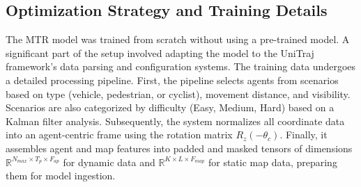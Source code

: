 \subsection{Optimization Strategy and Training Details}
\label{sec:model_optimization_details}
The MTR model was trained from scratch without using a pre-trained model. A significant part of the setup involved adapting the model to the UniTraj framework's data parsing and configuration systems. The training data undergoes a detailed processing pipeline. First, the pipeline selects agents from scenarios based on type (vehicle, pedestrian, or cyclist), movement distance, and visibility. Scenarios are also categorized by difficulty (Easy, Medium, Hard) based on a Kalman filter analysis. Subsequently, the system normalizes all coordinate data into an agent-centric frame using the rotation matrix $R_{z}(-\theta_{c})$. Finally, it assembles agent and map features into padded and masked tensors of dimensions $\mathbb{R}^{N_{max}\times T_{p}\times F_{ap}}$ for dynamic data and $\mathbb{R}^{K\times L\times F_{map}}$ for static map data, preparing them for model ingestion.
